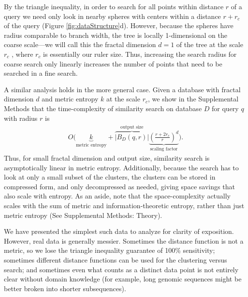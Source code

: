\documentclass[review,preprint,12pt]{elsarticle}
\renewcommand{\cite}{\citep} %
\theoremstyle{definition}
\theoremstyle{remark}
\numberwithin{equation}{section}
\begin{document}
By the triangle inequality, in order to search for all points within distance $r$ of a query we need only look in nearby spheres with centers within a distance $r+r_c$ of the query (Figure \ref{fig:dataStructure}d).
However, because the spheres have radius comparable to branch width, the tree is locally 1-dimensional on the coarse scale---we will call this the fractal dimension $d=1$ of the tree at the scale $r_c$ \cite{falconer1990fractal}, where $r_c$ is essentially our ruler size.
Thus, increasing the search radius for coarse search only linearly increases the number of points that need to be searched in a fine search.

A similar analysis holds in the more general case.
Given a database with fractal dimension $d$ and metric entropy $k$ at the scale $r_c$, we show in the Supplemental Methods that the time-complexity of similarity search on database $D$ for query $q$ with radius $r$ is
\begin{gather}
    O\Bigg(
    \underbrace{k}_{\textrm{metric entropy}} +
    \overbrace{\left|B_D(q,r)\right|}^{\textrm{output size}}
    \underbrace{\left(\frac{r+2r_c}{r}\right)^d}_{\textrm{scaling factor}}
     \Bigg) .
\end{gather}
Thus, for small fractal dimension and output size, similarity search is asymptotically linear in metric entropy.
Additionally, because the search has to look at only a small subset of the clusters, the clusters can be stored in compressed form, and only decompressed as needed, giving space savings that also scale with entropy.
As an aside, note that the space-complexity actually scales with the sum of metric and information-theoretic entropy, rather than just metric entropy (See Supplemental Methods: Theory).

We have presented the simplest such data to analyze for clarity of exposition.
However, real data is generally messier.
Sometimes the distance function is not a metric, so we lose the triangle inequality guarantee of 100\% sensitivity;
sometimes different distance functions can be used for the clustering versus search;
and sometimes even what counts as a distinct data point is not entirely clear without domain knowledge (for example, long genomic sequences might be better broken into shorter subsequences).
\end{document}

